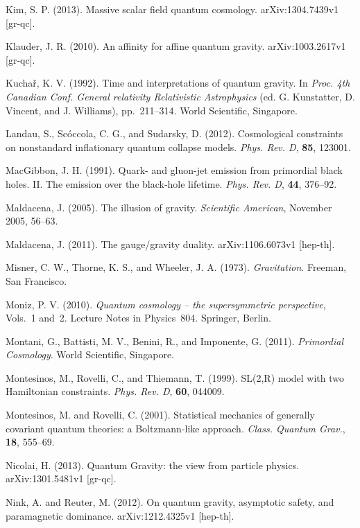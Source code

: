 \documentclass[12pt]{article}
\begin{document}
\bibitem{} Kim, S. P. (2013). Massive scalar field quantum cosmology.
         arXiv:1304.7439v1 [gr-qc].

\bibitem{} Klauder, J. R. (2010). An affinity for affine quantum
gravity. arXiv:1003.2617v1 [gr-qc].

\bibitem{} Kucha\v{r}, K. V. (1992). Time and interpretations of quantum
           gravity. In {\em Proc. 4th Canadian Conf.
           General relativity Relativistic Astrophysics}
           (ed. G. Kunstatter, D. Vincent, and J. Williams), pp.~211--314.
           World Scientific, Singapore. 

\bibitem{} Landau, S., Sc\'occola, C. G., and Sudarsky, D. (2012).
Cosmological constraints on nonstandard inflationary quantum collapse
models. {\em Phys. Rev. D}, {\bf 85}, 123001.

\bibitem{} MacGibbon, J. H. (1991). Quark- and
gluon-jet emission from primordial black holes. II. The emission over
the black-hole lifetime. {\em Phys. Rev. D}, {\bf 44}, 376--92.

\bibitem{} Maldacena, J. (2005). The illusion of gravity.
         {\em Scientific American}, November 2005, 56--63.

\bibitem{} Maldacena, J. (2011). The gauge/gravity duality.
           arXiv:1106.6073v1 [hep-th].

\bibitem{} Misner, C. W., Thorne, K. S., and Wheeler, J. A. (1973).
           {\em Gravitation}. Freeman, San Francisco.

\bibitem{} Moniz, P. V. (2010). {\em Quantum cosmology -- the
supersymmetric perspective}, Vols.~1 and~2. Lecture Notes in
Physics~804. Springer, Berlin.

\bibitem{} Montani, G., Battisti, M. V., Benini, R., and Imponente,
  G. (2011). {\em Primordial Cosmology}. World Scientific, Singapore.

\bibitem{} Montesinos, M., Rovelli, C., and Thiemann, T. (1999). 
SL(2,R) model with two Hamiltonian constraints. {\em Phys. Rev. D},
{\bf 60}, 044009.

\bibitem{} Montesinos, M. and Rovelli, C. (2001). Statistical
  mechanics of generally covariant quantum theories: a Boltzmann-like
  approach. {\em Class. Quantum Grav.}, {\bf 18}, 555--69.

\bibitem{} Nicolai, H. (2013). Quantum Gravity: the view from particle
           physics. arXiv:1301.5481v1 [gr-qc].

\bibitem{} Nink, A. and Reuter, M. (2012). On quantum gravity,
  asymptotic safety, and paramagnetic dominance. arXiv:1212.4325v1 [hep-th].
\end{document}

